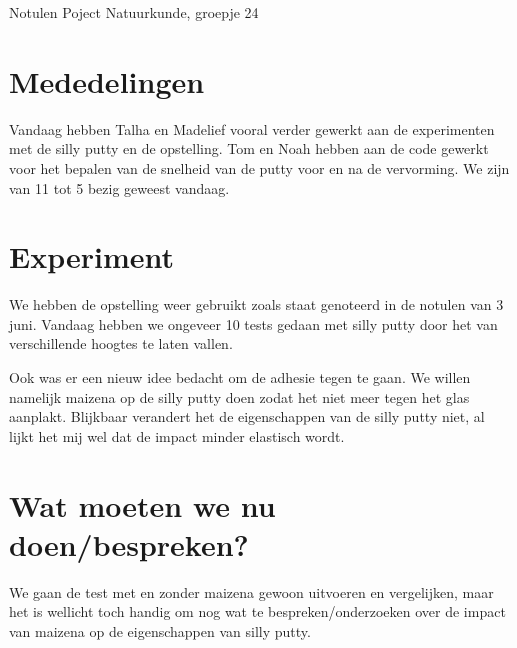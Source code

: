 \documentclass[11pt,a4paper]{article}
\begin{document}
\begin{Minutes}{Notulen Poject Natuurkunde, groepje 24}


\endtime{}
\location{}




\maketitle



\newpage


\section{Mededelingen} 
Vandaag hebben Talha en Madelief vooral verder gewerkt aan de experimenten met de silly putty en de opstelling. Tom en Noah hebben aan de code gewerkt voor het bepalen van de snelheid van de putty voor en na de vervorming. We zijn van 11 tot 5 bezig geweest vandaag.

\section{Experiment}
We hebben de opstelling weer gebruikt zoals staat genoteerd in de notulen van 3 juni. Vandaag hebben we ongeveer 10 tests gedaan met silly putty door het van verschillende hoogtes te laten vallen.

Ook was er een nieuw idee bedacht om de adhesie tegen te gaan. We willen namelijk maizena op de silly putty doen zodat het niet meer tegen het glas aanplakt. Blijkbaar verandert het de eigenschappen van de silly putty niet, al lijkt het mij wel dat de impact minder elastisch wordt.

\section{Wat moeten we nu doen/bespreken?}
We gaan de test met en zonder maizena gewoon uitvoeren en vergelijken, maar het is wellicht toch handig om nog wat te bespreken/onderzoeken over de impact van maizena op de eigenschappen van silly putty.




\end{Minutes}
\end{document}

